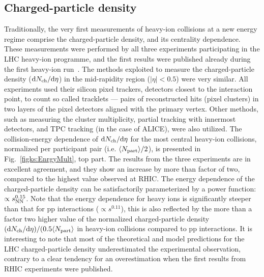 \subsection{Charged-particle density}
\label{subsecks:partdensity}
Traditionally, the very first measurements of heavy-ion collisions at a new energy regime comprise the charged-particle density, and its centrality dependence. These measurements were performed by all three experiments participating in the LHC heavy-ion programme, and the first results were published already during the first heavy-ion run~\cite{Aamodt:2010pb}. The methods exploited to measure the charged-particle density (${\rm d}N_{\rm ch}/{\rm d}\eta$) in the mid-rapidity region ($|\eta| < 0.5$) were very similar. All experiments used their silicon pixel trackers, detectors closest to the interaction point, to count so called tracklets --- pairs of reconstructed hits (pixel clusters) in two layers of the pixel detectors aligned with the primary vertex. Other methods, such as measuring the cluster multiplicity, partial tracking with innermost detectors, and TPC tracking (in the case of ALICE), were also utilized. The collision-energy dependence of ${\rm d}N_{\rm ch}/{\rm d}\eta$ for the most central heavy-ion collisions, normalized per participant pair (i.e. $\langle N_{\rm part} \rangle /2$), is presented in Fig.~\ref{figks:EnrgyMult}, top part. The results from the three experiments are in excellent agreement, and they show an increase by more than factor of two, compared to the highest value observed at RHIC. The energy dependence of the charged-particle density can be satisfactorily parameterized by a power function: $\propto s_{\rm NN}^{0.15}$. Note that the energy dependence for heavy ions is significantly steeper than that for pp interactions ($\propto s^{0.11}$), this is also reflected by the more than a factor two higher value of the normalized charged-particle density $({\rm d}N_{\rm ch}/{\rm d}\eta)/(0.5\langle N_{\rm part} \rangle$ in heavy-ion collisions compared to pp interactions. It is interesting to note that most of the theoretical and model predictions for the LHC charged-particle density underestimated the experimental observation, contrary to a clear tendency for an overestimation when the first results from RHIC experiments were published.

